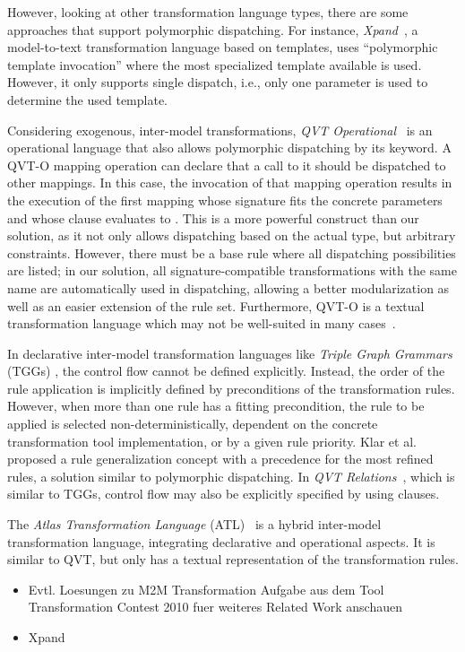 However, looking at other transformation language types, there are some approaches that support polymorphic dispatching. 
For instance, \emph{Xpand}~\cite{xpand}, a model-to-text transformation language based on templates, uses ``polymorphic template invocation'' where the most specialized template available is used.
However, it only supports single dispatch, i.e., only one parameter is used to determine the used template.   

Considering exogenous, inter-model transformations, \emph{QVT Operational}~\cite{QVT} is an operational language that also allows polymorphic dispatching by its  keyword.
A QVT-O mapping operation can declare that a call to it should be dispatched to other mappings.
In this case, the invocation of that mapping operation results in the execution of the first mapping whose signature fits the concrete parameters and whose  clause evaluates to .
This is a more powerful construct than our solution, as it not only allows dispatching based on the actual type, but arbitrary constraints.
However, there must be a base rule where all dispatching possibilities are listed;
in our solution, all signature-compatible transformations with the same name are automatically used in dispatching, allowing a better modularization as well as an easier extension of the rule set.      
Furthermore, QVT-O is a textual transformation language which may not be well-suited in many cases~\cite{Moo09}.

In declarative inter-model transformation languages like \emph{Triple Graph Grammars} (TGGs) \cite{Sch94}, the control flow cannot be defined explicitly.
Instead, the order of the rule application is implicitly defined by preconditions of the transformation rules.
However, when more than one rule has a fitting precondition, the rule to be applied is selected non-deterministically, dependent on the concrete transformation tool implementation, or by a given rule priority.
Klar et al. \cite{Klar07} proposed a rule generalization concept with a precedence for the most refined rules, a solution similar to polymorphic dispatching.
In \emph{QVT Relations}~\cite{QVT}, which is similar to TGGs, control flow may also be explicitly specified by using  clauses.

The \emph{Atlas Transformation Language} (ATL)~\cite{ATL} is a hybrid inter-model transformation language, integrating declarative and operational aspects.
It is similar to QVT, but only has a textual representation of the transformation rules.


\begin{itemize}
 \item Evtl. Loesungen zu M2M Transformation Aufgabe aus dem Tool Transformation Contest 2010 fuer weiteres Related Work anschauen
 \item Xpand
\end{itemize}
